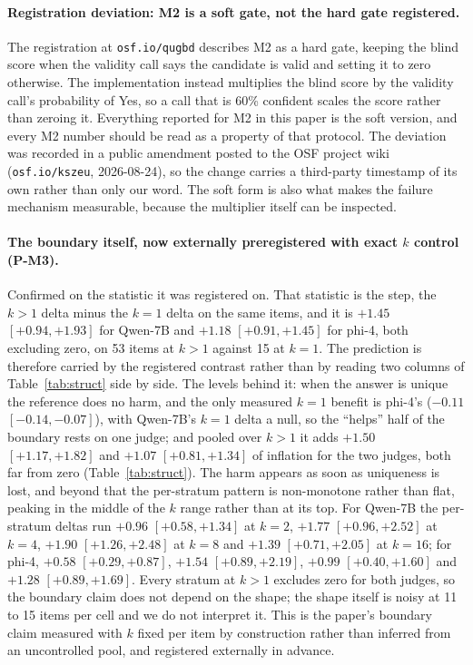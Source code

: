 \documentclass[11pt]{article}
\begin{document}
\paragraph{Registration deviation: M2 is a soft gate, not the hard gate registered.}
The registration at \texttt{osf.io/qugbd} describes M2 as a hard gate, keeping the blind score when the validity call says the candidate is valid and setting it to zero otherwise.
The implementation instead multiplies the blind score by the validity call's probability of Yes, so a call that is 60\% confident scales the score rather than zeroing it.
Everything reported for M2 in this paper is the soft version, and every M2 number should be read as a property of that protocol.
The deviation was recorded in a public amendment posted to the OSF project wiki (\texttt{osf.io/kszeu}, 2026-08-24), so the change carries a third-party timestamp of its own rather than only our word.
The soft form is also what makes the failure mechanism measurable, because the multiplier itself can be inspected.

\paragraph{The boundary itself, now externally preregistered with exact $k$ control (P-M3).}
Confirmed on the statistic it was registered on.
That statistic is the step, the $k > 1$ delta minus the $k{=}1$ delta on the same items, and it is $+1.45$ $[+0.94, +1.93]$ for Qwen-7B and $+1.18$ $[+0.91, +1.45]$ for phi-4, both excluding zero, on 53 items at $k > 1$ against 15 at $k{=}1$.
The prediction is therefore carried by the registered contrast rather than by reading two columns of Table~\ref{tab:struct} side by side.
The levels behind it: when the answer is unique the reference does no harm, and the only measured $k{=}1$ benefit is phi-4's ($-0.11$ $[-0.14, -0.07]$), with Qwen-7B's $k{=}1$ delta a null, so the ``helps'' half of the boundary rests on one judge; and pooled over $k > 1$ it adds $+1.50$ $[+1.17, +1.82]$ and $+1.07$ $[+0.81, +1.34]$ of inflation for the two judges, both far from zero (Table~\ref{tab:struct}).
The harm appears as soon as uniqueness is lost, and beyond that the per-stratum pattern is non-monotone rather than flat, peaking in the middle of the $k$ range rather than at its top.
For Qwen-7B the per-stratum deltas run $+0.96$ $[+0.58, +1.34]$ at $k{=}2$, $+1.77$ $[+0.96, +2.52]$ at $k{=}4$, $+1.90$ $[+1.26, +2.48]$ at $k{=}8$ and $+1.39$ $[+0.71, +2.05]$ at $k{=}16$; for phi-4, $+0.58$ $[+0.29, +0.87]$, $+1.54$ $[+0.89, +2.19]$, $+0.99$ $[+0.40, +1.60]$ and $+1.28$ $[+0.89, +1.69]$.
Every stratum at $k>1$ excludes zero for both judges, so the boundary claim does not depend on the shape; the shape itself is noisy at 11 to 15 items per cell and we do not interpret it.
This is the paper's boundary claim measured with $k$ fixed per item by construction rather than inferred from an uncontrolled pool, and registered externally in advance.
\end{document}
